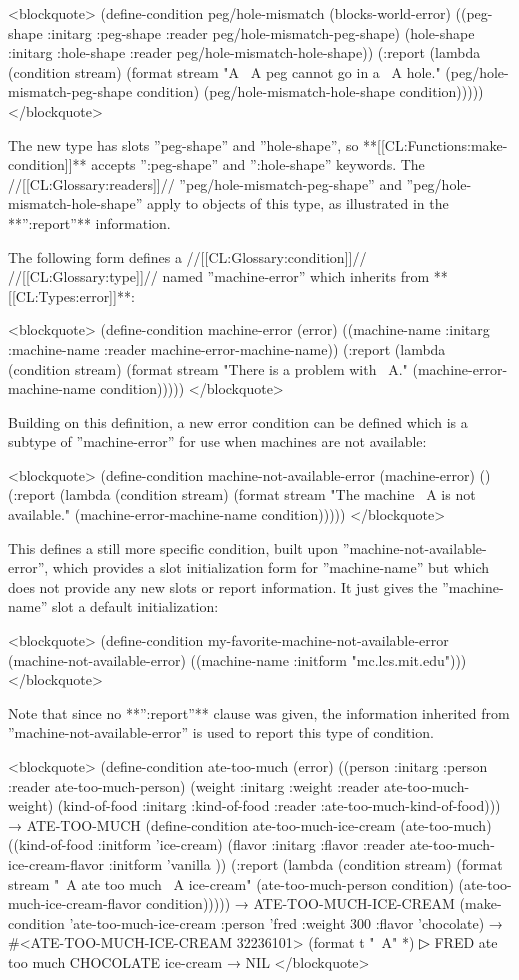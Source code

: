 <blockquote> (define-condition peg/hole-mismatch (blocks-world-error) ((peg-shape :initarg :peg-shape :reader peg/hole-mismatch-peg-shape) (hole-shape :initarg :hole-shape :reader peg/hole-mismatch-hole-shape)) (:report (lambda (condition stream) (format stream "A ~A peg cannot go in a ~A hole." (peg/hole-mismatch-peg-shape condition) (peg/hole-mismatch-hole-shape condition))))) </blockquote>

The new type has slots ''peg-shape'' and ''hole-shape'', so **[[CL:Functions:make-condition]]** accepts '':peg-shape'' and '':hole-shape'' keywords. The //[[CL:Glossary:readers]]// ''peg/hole-mismatch-peg-shape'' and ''peg/hole-mismatch-hole-shape'' apply to objects of this type, as illustrated in the **'':report''** information.

The following form defines a //[[CL:Glossary:condition]]// //[[CL:Glossary:type]]// named ''machine-error'' which inherits from **[[CL:Types:error]]**:

<blockquote> (define-condition machine-error (error) ((machine-name :initarg :machine-name :reader machine-error-machine-name)) (:report (lambda (condition stream) (format stream "There is a problem with ~A." (machine-error-machine-name condition))))) </blockquote>

Building on this definition, a new error condition can be defined which is a subtype of ''machine-error'' for use when machines are not available:

<blockquote> (define-condition machine-not-available-error (machine-error) () (:report (lambda (condition stream) (format stream "The machine ~A is not available." (machine-error-machine-name condition))))) </blockquote>

This defines a still more specific condition, built upon ''machine-not-available-error'', which provides a slot initialization form for ''machine-name'' but which does not provide any new slots or report information. It just gives the ''machine-name'' slot a default initialization:

<blockquote> (define-condition my-favorite-machine-not-available-error (machine-not-available-error) ((machine-name :initform "mc.lcs.mit.edu"))) </blockquote>

Note that since no **'':report''** clause was given, the information inherited from ''machine-not-available-error'' is used to report this type of condition.

<blockquote> (define-condition ate-too-much (error) ((person :initarg :person :reader ate-too-much-person) (weight :initarg :weight :reader ate-too-much-weight) (kind-of-food :initarg :kind-of-food :reader :ate-too-much-kind-of-food))) → ATE-TOO-MUCH (define-condition ate-too-much-ice-cream (ate-too-much) ((kind-of-food :initform 'ice-cream) (flavor :initarg :flavor :reader ate-too-much-ice-cream-flavor :initform 'vanilla )) (:report (lambda (condition stream) (format stream "~A ate too much ~A ice-cream" (ate-too-much-person condition) (ate-too-much-ice-cream-flavor condition))))) → ATE-TOO-MUCH-ICE-CREAM (make-condition 'ate-too-much-ice-cream :person 'fred :weight 300 :flavor 'chocolate) → #<ATE-TOO-MUCH-ICE-CREAM 32236101> (format t "~A" *)
▷ FRED ate too much CHOCOLATE ice-cream → NIL </blockquote>

